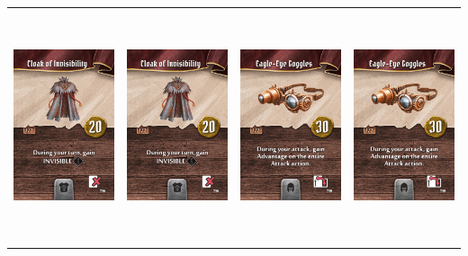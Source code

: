 \documentclass{minimal}
\begin{document}
{\begin{longtable}{llll}
\includegraphics[width=44mm,height=68mm]{./1-14/gh-005-cloak-of-invisibility.png} &
\includegraphics[width=44mm,height=68mm]{./1-14/gh-005-cloak-of-invisibility.png} &
\includegraphics[width=44mm,height=68mm]{./1-14/gh-006-eagle-eye-goggles.png} &
\includegraphics[width=44mm,height=68mm]{./1-14/gh-006-eagle-eye-goggles.png}\\ 

\end{longtable}}
\end{document}
